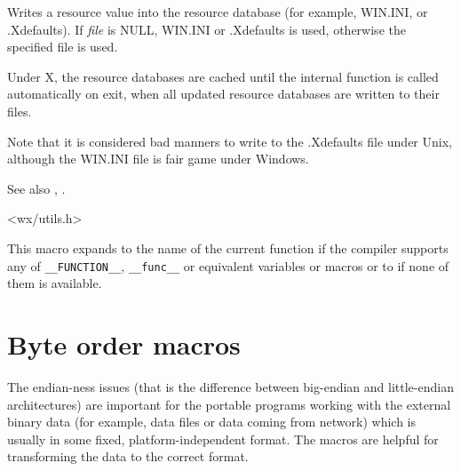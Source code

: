 

Writes a resource value into the resource database (for example, WIN.INI, or
.Xdefaults). If {\it file} is NULL, WIN.INI or .Xdefaults is used,
otherwise the specified file is used.

Under X, the resource databases are cached until the internal function
 is called automatically on exit, when
all updated resource databases are written to their files.

Note that it is considered bad manners to write to the .Xdefaults
file under Unix, although the WIN.INI file is fair game under Windows.

See also , .


<wx/utils.h>


\label{wxfunction}


This macro expands to the name of the current function if the compiler supports
any of \texttt{\_\_FUNCTION\_\_}, \texttt{\_\_func\_\_} or equivalent variables
or macros or to \NULL if none of them is available.



\section{Byte order macros}\label{byteordermacros}

The endian-ness issues (that is the difference between big-endian and
little-endian architectures) are important for the portable programs working
with the external binary data (for example, data files or data coming from
network) which is usually in some fixed, platform-independent format. The
macros are helpful for transforming the data to the correct format.


\label{intswapalways}


